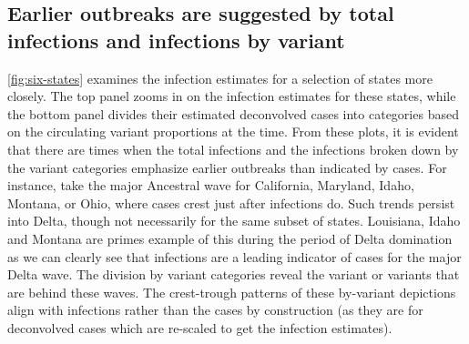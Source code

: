 \documentclass{article}
\begin{document}
    
\subsection{Earlier outbreaks are suggested by total infections and infections by variant}
\label{sec:infections-by-voc}

\autoref{fig:six-states} examines the infection estimates for a selection of
states more closely. The top panel zooms in on the infection estimates for these states, while the bottom panel divides their estimated deconvolved cases into categories based on the circulating variant proportions at the time. From these plots, it is evident that there are times when the total infections and the infections broken down by the variant categories emphasize earlier outbreaks than indicated by cases. For instance, take the major Ancestral wave for California, Maryland, Idaho, Montana, or Ohio, where cases crest just after infections do. Such trends persist into Delta, though not necessarily for the same subset of states. Louisiana, Idaho and Montana are primes example of this during the period of Delta domination as we can clearly see that infections are a leading indicator of cases for the major Delta wave. The division by variant categories reveal the variant or variants that are behind these waves. The crest-trough patterns of these by-variant depictions align with infections rather than the cases by construction (as they are for deconvolved cases which are re-scaled to get the infection estimates). 
\end{document}
